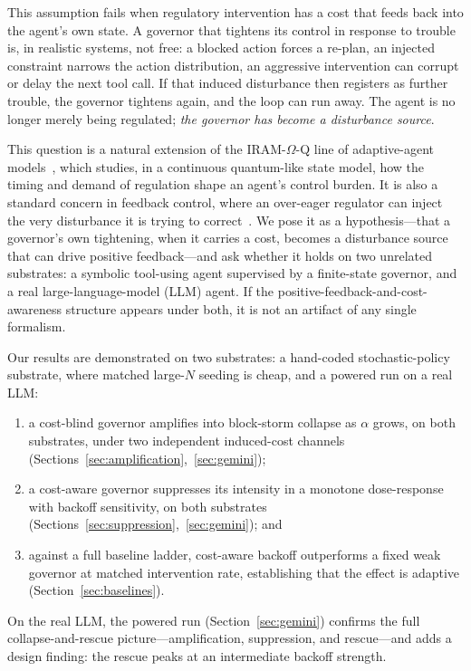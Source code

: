 \documentclass[11pt]{article}
\begin{document}
This assumption fails when regulatory intervention has a cost that feeds back
into the agent's own state. A governor that tightens its control in response to
trouble is, in realistic systems, not free: a blocked action forces a re-plan,
an injected constraint narrows the action distribution, an aggressive
intervention can corrupt or delay the next tool call. If that induced
disturbance then registers as further trouble, the governor tightens again, and
the loop can run away. The agent is no longer merely being regulated;
\emph{the governor has become a disturbance source}.

This question is a natural extension of the IRAM-$\Omega$-Q line of
adaptive-agent
models~\cite{ziegler2026iramomegaq,ziegler2026carryover,ziegler2026switching},
which studies, in a continuous quantum-like state model, how the timing and
demand of regulation shape an agent's control burden. It is also a standard
concern in feedback control, where an over-eager regulator can inject the very
disturbance it is trying to correct~\cite{astrom2008feedback}. We pose it as a
hypothesis---that a governor's own tightening, when it carries a cost, becomes a
disturbance source that can drive positive feedback---and ask whether it holds
on two unrelated substrates: a symbolic tool-using agent supervised by a
finite-state governor, and a real large-language-model (LLM) agent. If the
positive-feedback-and-cost-awareness structure appears under both, it is not an
artifact of any single formalism.

Our results are demonstrated on two substrates: a hand-coded stochastic-policy
substrate, where matched large-$N$ seeding is cheap, and a powered run on a real
LLM:
\begin{enumerate}[leftmargin=1.4em]
\item a cost-blind governor amplifies into block-storm collapse as $\alpha$
grows, on both substrates, under two independent induced-cost channels
(Sections~\ref{sec:amplification},~\ref{sec:gemini});
\item a cost-aware governor suppresses its intensity in a monotone
dose-response with backoff sensitivity, on both substrates
(Sections~\ref{sec:suppression},~\ref{sec:gemini}); and
\item against a full baseline ladder, cost-aware backoff outperforms a fixed
weak governor at matched intervention rate, establishing that the effect is
adaptive (Section~\ref{sec:baselines}).
\end{enumerate}
On the real LLM, the powered run (Section~\ref{sec:gemini}) confirms the full
collapse-and-rescue picture---amplification, suppression, and rescue---and adds
a design finding: the rescue peaks at an intermediate backoff strength.
\end{document}
